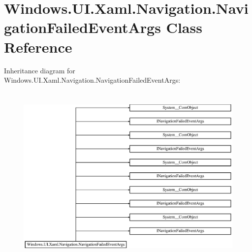 \hypertarget{class_windows_1_1_u_i_1_1_xaml_1_1_navigation_1_1_navigation_failed_event_args}{}\section{Windows.\+U\+I.\+Xaml.\+Navigation.\+Navigation\+Failed\+Event\+Args Class Reference}
\label{class_windows_1_1_u_i_1_1_xaml_1_1_navigation_1_1_navigation_failed_event_args}
Inheritance diagram for Windows.\+U\+I.\+Xaml.\+Navigation.\+Navigation\+Failed\+Event\+Args\+:\begin{figure}[H]
\begin{center}
\leavevmode
\includegraphics[height=9.085546cm]{class_windows_1_1_u_i_1_1_xaml_1_1_navigation_1_1_navigation_failed_event_args}
\end{center}
\end{figure}
